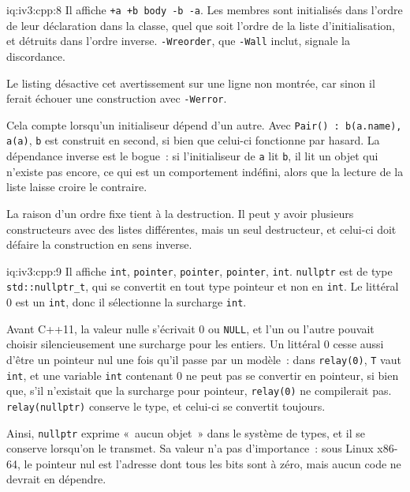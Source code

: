 \begin{solution}{iq:iv3:cpp:8}
Il affiche \texttt{+a +b body -b -a}. Les membres sont initialisés dans l'ordre de leur déclaration dans la classe, quel que soit l'ordre de la liste d'initialisation, et détruits dans l'ordre inverse. \texttt{-Wreorder}, que \texttt{-Wall} inclut, signale la discordance.

Le listing désactive cet avertissement sur une ligne non montrée, car sinon il ferait échouer une construction avec \texttt{-Werror}.

Cela compte lorsqu'un initialiseur dépend d'un autre. Avec \texttt{Pair() : b(a.name), a(\textquotedbl{}a\textquotedbl{})}, \texttt{b} est construit en second, si bien que celui-ci fonctionne par hasard. La dépendance inverse est le bogue~: si l'initialiseur de \texttt{a} lit \texttt{b}, il lit un objet qui n'existe pas encore, ce qui est un comportement indéfini, alors que la lecture de la liste laisse croire le contraire.

La raison d'un ordre fixe tient à la destruction. Il peut y avoir plusieurs constructeurs avec des listes différentes, mais un seul destructeur, et celui-ci doit défaire la construction en sens inverse.

\end{solution}

\begin{solution}{iq:iv3:cpp:9}
Il affiche \texttt{int}, \texttt{pointer}, \texttt{pointer}, \texttt{pointer}, \texttt{int}. \texttt{nullptr} est de type \texttt{std::nullptr\_t}, qui se convertit en tout type pointeur et non en \texttt{int}. Le littéral 0 est un \texttt{int}, donc il sélectionne la surcharge \texttt{int}.

Avant C++11, la valeur nulle s'écrivait 0 ou \texttt{NULL}, et l'un ou l'autre pouvait choisir silencieusement une surcharge pour les entiers. Un littéral 0 cesse aussi d'être un pointeur nul une fois qu'il passe par un modèle~: dans \texttt{relay(0)}, \texttt{T} vaut \texttt{int}, et une variable \texttt{int} contenant 0 ne peut pas se convertir en pointeur, si bien que, s'il n'existait que la surcharge pour pointeur, \texttt{relay(0)} ne compilerait pas. \texttt{relay(nullptr)} conserve le type, et celui-ci se convertit toujours.

Ainsi, \texttt{nullptr} exprime «~aucun objet~» dans le système de types, et il se conserve lorsqu'on le transmet. Sa valeur n'a pas d'importance~: sous Linux x86-64, le pointeur nul est l'adresse dont tous les bits sont à zéro, mais aucun code ne devrait en dépendre.

\end{solution}

